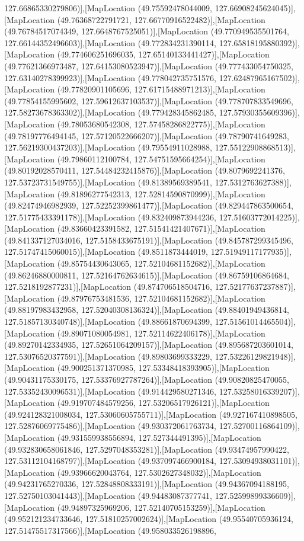 127.66865330279806)],[MapLocation (49.75592478044009, 127.66908245624045)],[MapLocation (49.76368722791721, 127.66770916522482)],[MapLocation (49.76784517074349, 127.6648767525051)],[MapLocation (49.770949535501764, 127.66144352496603)],[MapLocation (49.772834231390114, 127.65818195880392)],[MapLocation (49.774606251696035, 127.65140133441427)],[MapLocation (49.77621366973487, 127.64153080523947)],[MapLocation (49.777433054750325, 127.63140278399923)],[MapLocation (49.778042735751576, 127.62487965167502)],[MapLocation (49.77820901105696, 127.61715488971213)],[MapLocation (49.77854155995602, 127.59612637103537)],[MapLocation (49.778707833549696, 127.58273678363302)],[MapLocation (49.779428345862485, 127.57930355609396)],[MapLocation (49.78053680542308, 127.57458286822775)],[MapLocation (49.78197776494145, 127.57120522666207)],[MapLocation (49.78790741649283, 127.56219300437203)],[MapLocation (49.79554911028988, 127.55122908868513)],[MapLocation (49.79860112100784, 127.54751595664254)],[MapLocation (49.80192028570411, 127.54484232415876)],[MapLocation (49.8079692241376, 127.53723731549755)],[MapLocation (49.81389569389541, 127.5312763627388)],[MapLocation (49.81896277542313, 127.52814590870999)],[MapLocation (49.82474946982939, 127.52252399861477)],[MapLocation (49.829447863500654, 127.51775433391178)],[MapLocation (49.832409873944236, 127.51603772014225)],[MapLocation (49.83660423391582, 127.51541421407671)],[MapLocation (49.841337127034016, 127.5158433675191)],[MapLocation (49.845787299345496, 127.51747415060015)],[MapLocation (49.8511873444019, 127.51949117177935)],[MapLocation (49.85754430643065, 127.52104681152682)],[MapLocation (49.86246880000811, 127.52164762634615)],[MapLocation (49.86759106864684, 127.5218192877231)],[MapLocation (49.874706518504716, 127.52177637237887)],[MapLocation (49.87976753481536, 127.52104681152682)],[MapLocation (49.88197983432958, 127.52040308136324)],[MapLocation (49.88401949436814, 127.51857130340748)],[MapLocation (49.88661870694399, 127.51561014465504)],[MapLocation (49.89071080054981, 127.52114622406178)],[MapLocation (49.89270142334935, 127.52651064209157)],[MapLocation (49.895687203601014, 127.53076520377591)],[MapLocation (49.89803699333229, 127.53226129821948)],[MapLocation (49.900251371370985, 127.53348418393905)],[MapLocation (49.90431175330175, 127.53376927787264)],[MapLocation (49.90820825470055, 127.53352430096531)],[MapLocation (49.914429580271346, 127.53258016339207)],[MapLocation (49.919707484579256, 127.53206517926121)],[MapLocation (49.924128321008034, 127.53060605755711)],[MapLocation (49.927167410898505, 127.52876069775486)],[MapLocation (49.930372061763734, 127.52700116864109)],[MapLocation (49.931559938556894, 127.527344491395)],[MapLocation (49.932830658061846, 127.5297048353281)],[MapLocation (49.93474957990422, 127.53112104168797)],[MapLocation (49.937097466900184, 127.53094938031101)],[MapLocation (49.93966620043764, 127.5302627348032)],[MapLocation (49.94231765270336, 127.52848808333191)],[MapLocation (49.94367094188195, 127.52750103041443)],[MapLocation (49.94483087377741, 127.52599899336609)],[MapLocation (49.94897325969206, 127.52140705153259)],[MapLocation (49.952121234733646, 127.51810257002624)],[MapLocation (49.95540705936124, 127.51475517317566)],[MapLocation (49.958033526198896, 